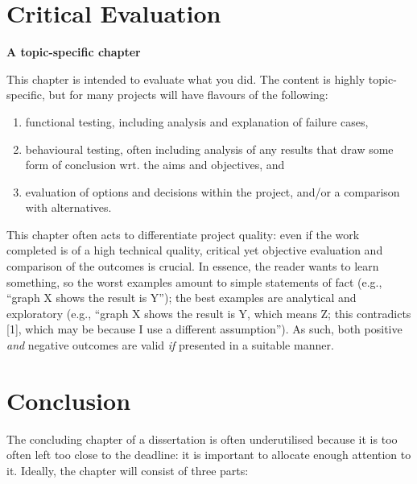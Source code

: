 \documentclass[ oneside,%
                    author={Michael Wray},
                    degree={BSc},
                     title={Some Structural Guidelines for CS Project Dissertations \\ With a Second Line Added to the Title},
                    unit={COMS30045},
                    subtitle={And Even A Fancy Subtitle}]{dissertation}
\begin{document}

\chapter{Critical Evaluation}
\label{chap:evaluation}

{\bf A topic-specific chapter} 
\vspace{1cm} 

\noindent
This chapter is intended to evaluate what you did.  The content is highly 
topic-specific, but for many projects will have flavours of the following:

\begin{enumerate}
\item functional  testing, including analysis and explanation of failure 
      cases,
\item behavioural testing, often including analysis of any results that 
      draw some form of conclusion wrt. the aims and objectives,
      and
\item evaluation of options and decisions within the project, and/or a
      comparison with alternatives.
\end{enumerate}

\noindent
This chapter often acts to differentiate project quality: even if the work
completed is of a high technical quality, critical yet objective evaluation 
and comparison of the outcomes is crucial.  In essence, the reader wants to
learn something, so the worst examples amount to simple statements of fact 
(e.g., ``graph X shows the result is Y''); the best examples are analytical 
and exploratory (e.g., ``graph X shows the result is Y, which means Z; this 
contradicts [1], which may be because I use a different assumption'').  As 
such, both positive {\em and} negative outcomes are valid {\em if} presented 
in a suitable manner.


\chapter{Conclusion}
\label{chap:conclusion}

\noindent
The concluding chapter of a dissertation is often underutilised because it 
is too often left too close to the deadline: it is important to allocate
enough attention to it.  Ideally, the chapter will consist of three parts:
\end{document}
